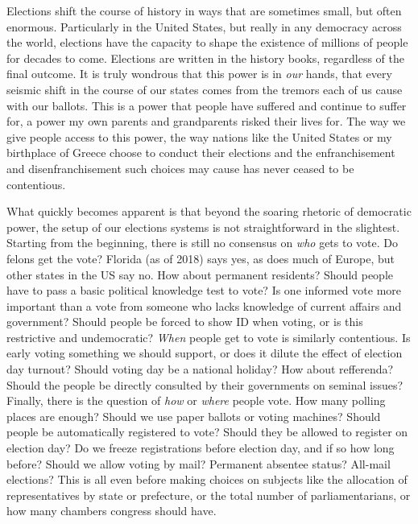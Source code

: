 \documentclass[12pt,twoside]{reedthesis}
\begin{document}
  Elections shift the course of history in ways that are sometimes small,
  but often enormous. Particularly in the United States, but really in any
  democracy across the world, elections have the capacity to shape the
  existence of millions of people for decades to come. Elections are
  written in the history books, regardless of the final outcome. It is
  truly wondrous that this power is in \emph{our} hands, that every
  seismic shift in the course of our states comes from the tremors each of
  us cause with our ballots. This is a power that people have suffered and
  continue to suffer for, a power my own parents and grandparents risked
  their lives for. The way we give people access to this power, the way
  nations like the United States or my birthplace of Greece choose to
  conduct their elections and the enfranchisement and disenfranchisement
  such choices may cause has never ceased to be contentious.
  
  What quickly becomes apparent is that beyond the soaring rhetoric of
  democratic power, the setup of our elections systems is not
  straightforward in the slightest. Starting from the beginning, there is
  still no consensus on \emph{who} gets to vote. Do felons get the vote?
  Florida (as of 2018) says yes, as does much of Europe, but other states
  in the US say no. How about permanent residents? Should people have to
  pass a basic political knowledge test to vote? Is one informed vote more
  important than a vote from someone who lacks knowledge of current
  affairs and government? Should people be forced to show ID when voting,
  or is this restrictive and undemocratic? \emph{When} people get to vote
  is similarly contentious. Is early voting something we should support,
  or does it dilute the effect of election day turnout? Should voting day
  be a national holiday? How about refferenda? Should the people be
  directly consulted by their governments on seminal issues? Finally,
  there is the question of \emph{how} or \emph{where} people vote. How
  many polling places are enough? Should we use paper ballots or voting
  machines? Should people be automatically registered to vote? Should they
  be allowed to register on election day? Do we freeze registrations
  before election day, and if so how long before? Should we allow voting
  by mail? Permanent absentee status? All-mail elections? This is all even
  before making choices on subjects like the allocation of representatives
  by state or prefecture, or the total number of parliamentarians, or how
  many chambers congress should have.
  
\end{document}
